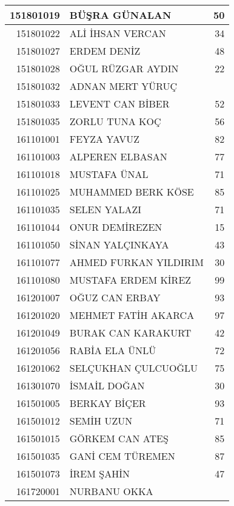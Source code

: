 \documentclass[12pt]{article}
\begin{document}
\begin{multicols}{2}
\begin{longtable}{||r||l||r||}
    \midrule
    151801019 & BÜŞRA GÜNALAN & 50 \\
    \midrule
    151801022 & ALİ İHSAN VERCAN & 34 \\
    \midrule
    151801027 & ERDEM DENİZ & 48 \\
    \midrule
    151801028 & OĞUL RÜZGAR AYDIN & 22 \\
    \midrule
    151801032 & ADNAN MERT YÜRUÇ &  \\
    \midrule
    151801033 & LEVENT CAN BİBER & 52 \\
    \midrule
    151801035 & ZORLU TUNA KOÇ & 56 \\
    \midrule
    161101001 & FEYZA YAVUZ & 82 \\
    \midrule
    161101003 & ALPEREN ELBASAN & 77 \\
    \midrule
    161101018 & MUSTAFA ÜNAL & 71 \\
    \midrule
    161101025 & MUHAMMED BERK KÖSE & 85 \\
    \midrule
    161101035 & SELEN YALAZI & 71 \\
    \midrule
    161101044 & ONUR DEMİREZEN & 15 \\
    \midrule
    161101050 & SİNAN YALÇINKAYA & 43 \\
    \midrule
    161101077 & AHMED FURKAN YILDIRIM & 30 \\
    \midrule
    161101080 & MUSTAFA ERDEM KİREZ & 99 \\
    \midrule
    161201007 & OĞUZ CAN ERBAY & 93 \\
    \midrule
    161201020 & MEHMET FATİH AKARCA & 97 \\
    \midrule
    161201049 & BURAK CAN KARAKURT & 42 \\
    \midrule
    161201056 & RABİA ELA ÜNLÜ & 72 \\
    \midrule
    161201062 & SELÇUKHAN ÇULCUOĞLU & 75 \\
    \midrule
    161301070 & İSMAİL DOĞAN & 30 \\
    \midrule
    161501005 & BERKAY BİÇER & 93 \\
    \midrule
    161501012 & SEMİH UZUN & 71 \\
    \midrule
    161501015 & GÖRKEM CAN ATEŞ & 85 \\
    \midrule
    161501035 & GANİ CEM TÜREMEN & 87 \\
    \midrule
    161501073 & İREM ŞAHİN & 47 \\
    \midrule
    161720001 & NURBANU OKKA &  \\
    \midrule

\end{longtable}
\end{multicols}
\end{document}
